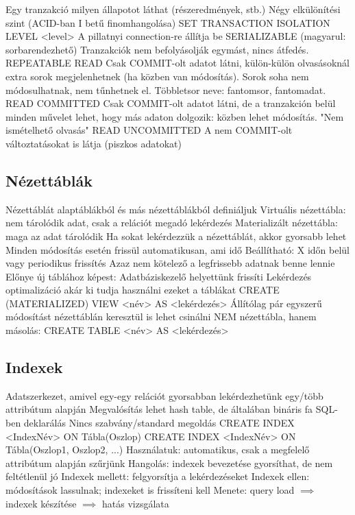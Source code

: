 \documentclass[12pt,a4paper]{article}
\begin{document}
\begin{outline}
	\1 Egy tranzakció milyen állapotot láthat (részeredmények, stb.)
	\1 Négy elkülönítési szint (ACID-ban I betű finomhangolása)
	\1 SET TRANSACTION ISOLATION LEVEL <level>
		\2 A pillatnyi connection-re állítja be
	\1 SERIALIZABLE (magyarul: sorbarendezhető)
		\2 Tranzakciók nem befolyásolják egymást, nincs átfedés.
	\1 REPEATABLE READ
		\2 Csak COMMIT-olt adatot látni, külön-külön olvasásoknál extra sorok megjelenhetnek (ha közben van módosítás). Sorok soha nem módosulhatnak, nem tűnhetnek el.
		\2 Többletsor neve: fantomsor, fantomadat.
	\1 READ COMMITTED
		\2 Csak COMMIT-olt adatot látni, de a tranzakción belül minden művelet lehet, hogy más adaton dolgozik: közben lehet módosítás.
		\2 "Nem ismételhető olvasás"
	\1 READ UNCOMMITTED
		\2 A nem COMMIT-olt változtatásokat is látja (piszkos adatokat)
\end{outline}

\pagebreak

\subsection{Nézettáblák}

\begin{outline}
	\1 Nézettáblát alaptáblákból és más nézettáblákból definiáljuk
	\1 Virtuális nézettábla: nem tárolódik adat, csak a relációt megadó lekérdezés
	\1 Materializált nézettábla: maga az adat tárolódik
		\2 Ha sokat lekérdezzük a nézettáblát, akkor gyorsabb lehet
		\2 Minden módosítás esetén frissül automatikusan, ami idő
			\3 Beállítható: X időn belül vagy periodikus frissítés
			\3 Azaz nem kötelező a legfrissebb adatnak benne lennie
		\2 Előnye új táblához képest:
			\3 Adatbáziskezelő helyettünk frissíti
			\3 Lekérdezés optimalizáció akár ki tudja használni ezeket a táblákat
	\1 CREATE (MATERIALIZED) VIEW <név> AS <lekérdezés>
	\1 Állítólag pár egyszerű módosítást nézettáblán keresztül is lehet csinálni
	\1 NEM nézettábla, hanem másolás: CREATE TABLE <név> AS <lekérdezés>
\end{outline}

\subsection{Indexek}

\begin{outline}
	\1 Adatszerkezet, amivel egy-egy relációt gyorsabban lekérdezhetünk egy/több attribútum alapján
	\1 Megvalósítás lehet hash table, de általában bináris fa
	\1 SQL-ben deklarálás
		\2 Nincs szabvány/standard megoldás
		\2 CREATE INDEX <IndexNév> ON Tábla(Oszlop)
		\2 CREATE INDEX <IndexNév> ON Tábla(Oszlop1, Oszlop2, ...)
	\1 Használatuk: automatikus, csak a megfelelő attribútum alapján szűrjünk
	\1 Hangolás: indexek bevezetése gyorsíthat, de nem feltétlenül jó
		\2 Indexek mellett: felgyorsítja a lekérdezéseket
		\2 Indexek ellen: módosítások lassulnak; indexeket is frissíteni kell
		\2 Menete: query load $\implies$ indexek készítése $\implies$ hatás vizsgálata
\end{outline}
\end{document}
